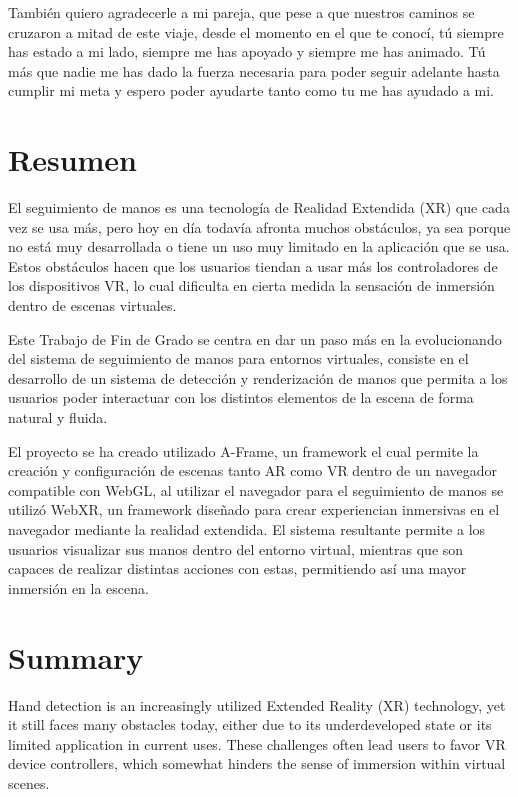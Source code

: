 \documentclass[a4paper, 12pt]{book}
\begin{document}
También quiero agradecerle a mi pareja, que pese a que nuestros caminos se cruzaron a mitad de este viaje, desde el momento en el que te conocí, tú siempre has estado a mi lado, siempre me has apoyado y siempre me has animado. Tú más que nadie me has dado la fuerza necesaria para poder seguir adelante hasta cumplir mi meta y espero poder ayudarte tanto como tu me has ayudado a mi. 


\chapter*{Resumen}
El seguimiento de manos es una tecnología de Realidad Extendida (XR) que cada vez se usa más, pero hoy en día todavía afronta muchos obstáculos, ya sea porque no está muy desarrollada o tiene un uso muy limitado en la aplicación que se usa. Estos obstáculos hacen que los usuarios tiendan a usar más los controladores de los dispositivos VR, lo cual dificulta en cierta medida la sensación de inmersión dentro de escenas virtuales. 

Este Trabajo de Fin de Grado se centra en dar un paso más en la evolucionando del sistema de seguimiento de manos para entornos virtuales, consiste en el desarrollo de un sistema de detección y renderización de manos que permita a los usuarios 
poder interactuar con los distintos elementos de la escena de forma natural y fluida.

El proyecto se ha creado utilizado A-Frame, un framework el cual permite la creación y configuración de escenas tanto AR como VR dentro de un navegador compatible con WebGL, al utilizar el navegador para el seguimiento de manos se utilizó WebXR, un framework diseñado para crear experiencian inmersivas en el navegador mediante la realidad extendida. El sistema resultante permite a los usuarios visualizar sus manos dentro del entorno virtual, mientras que son capaces de realizar distintas acciones con estas, permitiendo así una mayor inmersión en la escena.


\chapter*{Summary}
Hand detection is an increasingly utilized Extended Reality (XR) technology, yet it still faces many obstacles today, either due to its underdeveloped state or its limited application in current uses. These challenges often lead users to favor VR device controllers, which somewhat hinders the sense of immersion within virtual scenes.
\end{document}
